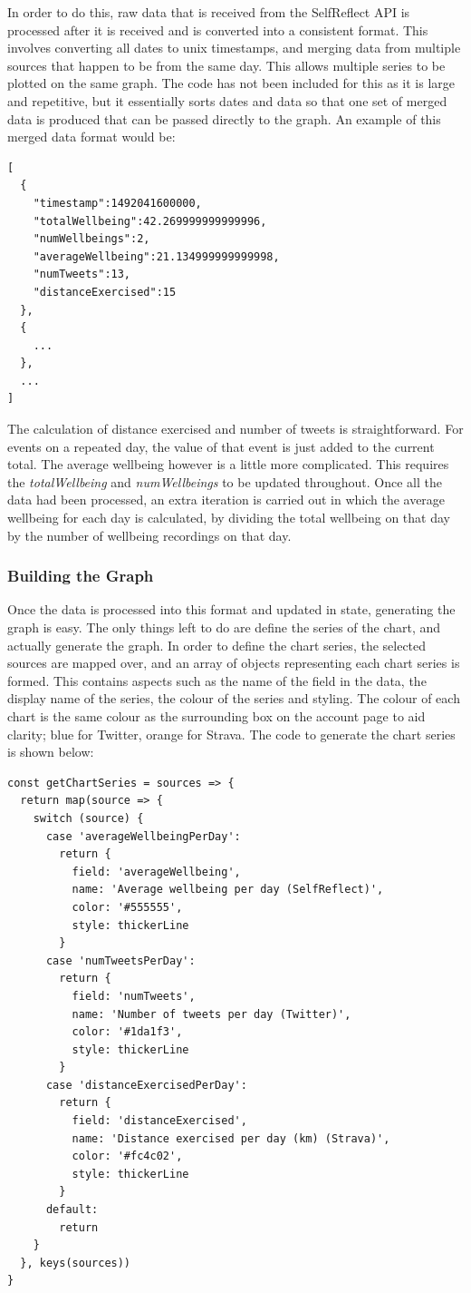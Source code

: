 \documentclass[11pt,openright,a4paper]{report}
\begin{document}
In order to do this, raw data that is received from the SelfReflect API is processed after it is received and is converted into a consistent format. This involves converting all dates to unix timestamps, and merging data from multiple sources that happen to be from the same day. This allows multiple series to be plotted on the same graph. The code has not been included for this as it is large and repetitive, but it essentially sorts dates and data so that one set of merged data is produced that can be passed directly to the graph. An example of this merged data format would be:
\begin{lstlisting}
[
  {
    "timestamp":1492041600000,
    "totalWellbeing":42.269999999999996,
    "numWellbeings":2,
    "averageWellbeing":21.134999999999998,
    "numTweets":13,
    "distanceExercised":15
  },
  {
    ...
  },
  ...
]
\end{lstlisting}
The calculation of distance exercised and number of tweets is straightforward. For events on a repeated day, the value of that event is just added to the current total. The average wellbeing however is a little more complicated. This requires the \emph{totalWellbeing} and \emph{numWellbeings} to be updated throughout. Once all the data had been processed, an extra iteration is carried out in which the average wellbeing for each day is calculated, by dividing the total wellbeing on that day by the number of wellbeing recordings on that day.

\subsubsection{Building the Graph}
Once the data is processed into this format and updated in state, generating the graph is easy. The only things left to do are define the series of the chart, and actually generate the graph. In order to define the chart series, the selected sources are mapped over, and an array of objects representing each chart series is formed. This contains aspects such as the name of the field in the data, the display name of the series, the colour of the series and styling. The colour of each chart is the same colour as the surrounding box on the account page to aid clarity; blue for Twitter, orange for Strava. The code to generate the chart series is shown below:
\begin{lstlisting}
const getChartSeries = sources => {
  return map(source => {
    switch (source) {
      case 'averageWellbeingPerDay':
        return {
          field: 'averageWellbeing',
          name: 'Average wellbeing per day (SelfReflect)',
          color: '#555555',
          style: thickerLine
        }
      case 'numTweetsPerDay':
        return {
          field: 'numTweets',
          name: 'Number of tweets per day (Twitter)',
          color: '#1da1f3',
          style: thickerLine
        }
      case 'distanceExercisedPerDay':
        return {
          field: 'distanceExercised',
          name: 'Distance exercised per day (km) (Strava)',
          color: '#fc4c02',
          style: thickerLine
        }
      default:
        return
    }
  }, keys(sources))
}
\end{lstlisting}
\end{document}
